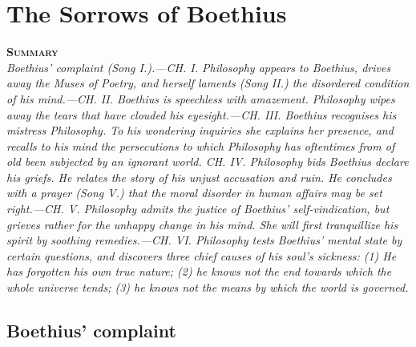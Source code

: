 \documentclass[11pt]{book}
\newenvironment{abstract}%
  {\noindent \textbf{\scshape Summary} \\ \rightskip1in\itshape\small}%
  {\bigskip}
\begin{document}
\mainmatter

\chapter{The Sorrows of Boethius}

\begin{abstract}
     Boethius' complaint (Song I.).---CH. I. Philosophy appears to
     Boethius, drives away the Muses of Poetry, and herself laments
     (Song II.) the disordered condition of his mind.---CH. II. \linebreak Boethius
     is speechless with amazement. Philosophy wipes away the tears that
     have clouded his eyesight.---CH. III. Boethius recognises his
     mistress Philosophy. To his wondering inquiries she explains her
     presence, and recalls to his mind the persecutions to which
     Philosophy has oftentimes from of old been subjected by an ignorant
     world. CH. IV. Philosophy bids Boethius declare his griefs. He
     relates the story of his unjust accusation and ruin. He concludes
     with a prayer (Song V.) that the moral disorder in human affairs
     may be set right.---CH. V. Philosophy admits the justice of
     Boethius' self-vindication, but grieves rather for the unhappy
     change in his mind. She will first tranquillize his spirit by
     soothing remedies.---CH. VI. Philosophy tests Boethius' mental
     state by certain questions, and discovers three chief causes of his
     soul's sickness: (1) He has forgotten his own true nature; (2) he
     knows not the end towards which the whole universe tends; (3) he
     knows not the means by which the world is governed.
\end{abstract}

\section{Boethius' complaint}
\end{document}
